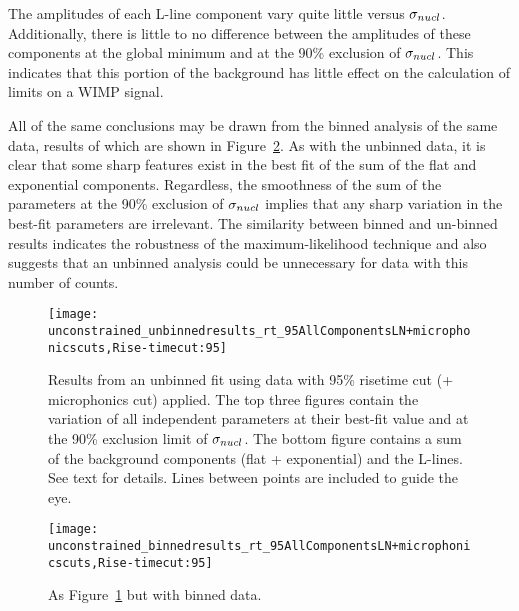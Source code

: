 The amplitudes of each L-line component vary quite little versus $\sigma_{nucl}$.  Additionally, there is little to no difference between the amplitudes of these components at the global minimum and at the 90\% exclusion of $\sigma_{nucl}$.  This indicates that this portion of the background has little effect on the calculation of limits on a WIMP signal.

All of the same conclusions may be drawn from the binned analysis of the same data, results of which are shown in Figure~\ref{fig:BinnedResultsNoConstrain}.  As with the unbinned data, it is clear that some sharp features exist in the best fit of the sum of the flat and exponential components.  Regardless, the smoothness of the sum of the parameters at the 90\% exclusion of $\sigma_{nucl}$ implies that any sharp variation in the best-fit parameters are irrelevant.  The similarity between binned and un-binned results indicates the robustness of the maximum-likelihood technique and also suggests that an unbinned analysis could be unnecessary for data with this number of counts.
  
			\begin{figure}
				\centering				
				\texttt{[image: unconstrained\_unbinnedresults\_rt\_95AllComponentsLN+microphonicscuts,Rise-timecut:95]}				
				
				\caption[Results from an unbinned fit using data with 95\% risetime cut (+ microphonics cut) applied]
				{Results from an unbinned fit using data with 95\% risetime cut (+ microphonics cut) applied.
				The top three figures contain the variation of all independent parameters at their best-fit value and at the 90\% exclusion
				limit of $\sigma_{nucl}$.  The bottom figure contains a sum of the background components (flat + exponential) and
				the L-lines.  See text for details.  Lines between points are included to guide the eye.}
				\label{fig:UnbinnedResultsNoConstrain}
			\end{figure}
			\begin{figure}
				\centering				
				\texttt{[image: unconstrained\_binnedresults\_rt\_95AllComponentsLN+microphonicscuts,Rise-timecut:95]}				
				
				\caption[Results from an binned fit using data with 95\% risetime cut (+ microphonics cut) applied]
				{As Figure~\ref{fig:UnbinnedResultsNoConstrain} but with binned data.}
				\label{fig:BinnedResultsNoConstrain}
			\end{figure}
			
